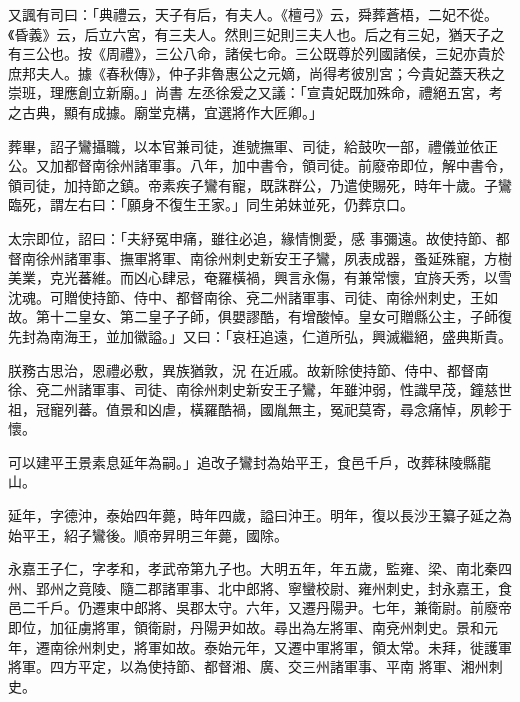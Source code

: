 \begin{pinyinscope}
 又諷有司曰：「典禮云，天子有后，有夫人。《檀弓》云，舜葬蒼梧，二妃不從。《昏義》云，后立六宮，有三夫人。然則三妃則三夫人也。后之有三妃，猶天子之有三公也。按《周禮》，三公八命，諸侯七命。三公既尊於列國諸侯，三妃亦貴於庶邦夫人。據《春秋傳》，仲子非魯惠公之元嫡，尚得考彼別宮；今貴妃蓋天秩之崇班，理應創立新廟。」尚書
 左丞徐爰之又議：「宣貴妃既加殊命，禮絕五宮，考之古典，顯有成據。廟堂克構，宜選將作大匠卿。」



 葬畢，詔子鸞攝職，以本官兼司徒，進號撫軍、司徒，給鼓吹一部，禮儀並依正公。又加都督南徐州諸軍事。八年，加中書令，領司徒。前廢帝即位，解中書令，領司徒，加持節之鎮。帝素疾子鸞有寵，既誅群公，乃遣使賜死，時年十歲。子鸞臨死，謂左右曰：「願身不復生王家。」同生弟妹並死，仍葬京口。



 太宗即位，詔曰：「夫紓冤申痛，雖往必追，緣情惻愛，感
 事彌遠。故使持節、都督南徐州諸軍事、撫軍將軍、南徐州刺史新安王子鸞，夙表成器，蚤延殊寵，方樹美業，克光蕃維。而凶心肆忌，奄羅橫禍，興言永傷，有兼常懷，宜旍夭秀，以雪沈魂。可贈使持節、侍中、都督南徐、兗二州諸軍事、司徒、南徐州刺史，王如故。第十二皇女、第二皇子子師，俱嬰謬酷，有增酸悼。皇女可贈縣公主，子師復先封為南海王，並加徽謚。」又曰：「哀枉追遠，仁道所弘，興滅繼絕，盛典斯貴。



 朕務古思治，恩禮必敷，異族猶敦，況
 在近戚。故新除使持節、侍中、都督南徐、兗二州諸軍事、司徒、南徐州刺史新安王子鸞，年雖沖弱，性識早茂，鐘慈世祖，冠寵列蕃。值景和凶虐，橫羅酷禍，國胤無主，冤祀莫寄，尋念痛悼，夙軫于懷。



 可以建平王景素息延年為嗣。」追改子鸞封為始平王，食邑千戶，改葬秣陵縣龍山。



 延年，字德沖，泰始四年薨，時年四歲，謚曰沖王。明年，復以長沙王纂子延之為始平王，紹子鸞後。順帝昇明三年薨，國除。



 永嘉王子仁，字孝和，孝武帝第九子也。大明五年，年五歲，監雍、梁、南北秦四州、郢州之竟陵、隨二郡諸軍事、北中郎將、寧蠻校尉、雍州刺史，封永嘉王，食邑二千戶。仍遷東中郎將、吳郡太守。六年，又遷丹陽尹。七年，兼衛尉。前廢帝即位，加征虜將軍，領衛尉，丹陽尹如故。尋出為左將軍、南兗州刺史。景和元年，遷南徐州刺史，將軍如故。泰始元年，又遷中軍將軍，領太常。未拜，徙護軍將軍。四方平定，以為使持節、都督湘、廣、交三州諸軍事、平南
 將軍、湘州刺史。




\end{pinyinscope}
